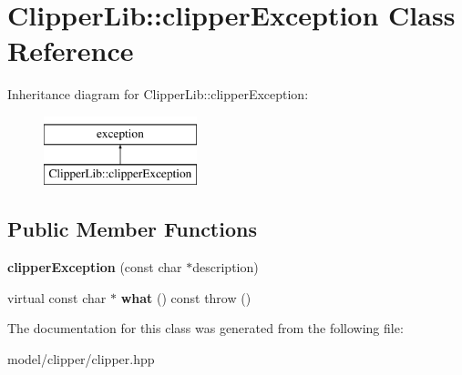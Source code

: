 \hypertarget{classClipperLib_1_1clipperException}{\section{Clipper\-Lib\-:\-:clipper\-Exception Class Reference}
\label{classClipperLib_1_1clipperException}
}
Inheritance diagram for Clipper\-Lib\-:\-:clipper\-Exception\-:\begin{figure}[H]
\begin{center}
\leavevmode
\includegraphics[height=2.000000cm]{classClipperLib_1_1clipperException}
\end{center}
\end{figure}
\subsection*{Public Member Functions}
\begin{DoxyCompactItemize}
\item 
\hypertarget{classClipperLib_1_1clipperException_a7d44b32d06cd870500355667f6e0d6ed}{{\bfseries clipper\-Exception} (const char $\ast$description)}\label{classClipperLib_1_1clipperException_a7d44b32d06cd870500355667f6e0d6ed}

\item 
\hypertarget{classClipperLib_1_1clipperException_a7bd8c881bda597f839670dde97fe04d4}{virtual const char $\ast$ {\bfseries what} () const   throw ()}\label{classClipperLib_1_1clipperException_a7bd8c881bda597f839670dde97fe04d4}

\end{DoxyCompactItemize}


The documentation for this class was generated from the following file\-:\begin{DoxyCompactItemize}
\item 
model/clipper/clipper.\-hpp\end{DoxyCompactItemize}

